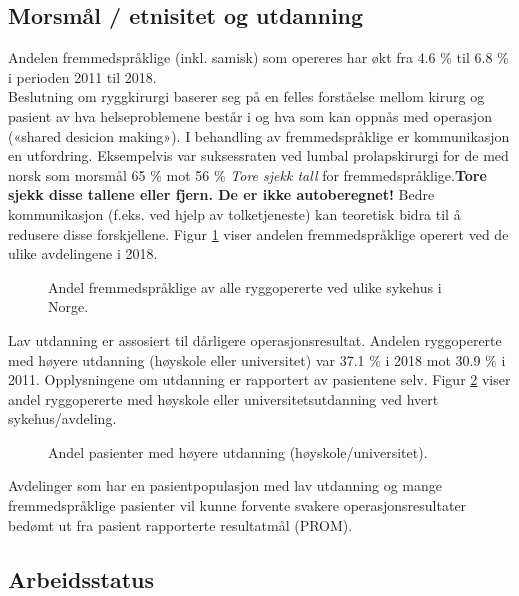 \documentclass [norsk,a4paper,twoside]{article}\usepackage[]{graphicx}\usepackage[]{color}
\begin{document}
\subsection{Morsmål / etnisitet og utdanning}



Andelen fremmedspråklige (inkl. samisk) som opereres har økt fra 4.6 \% til 6.8 \% i perioden 2011 til 2018.\\
Beslutning om ryggkirurgi baserer seg på en felles forståelse mellom kirurg og
pasient av hva helseproblemene består i og hva som kan oppnås med operasjon
(«shared desicion making»). I behandling av fremmedspråklige er kommunikasjon
en utfordring. Eksempelvis var suksessraten ved lumbal prolapskirurgi for de med norsk som morsmål 65 \% mot 56 \% 
\textit{Tore sjekk tall} 
for fremmedspråklige.\textbf{Tore sjekk disse tallene eller fjern. De er ikke autoberegnet!}  Bedre kommunikasjon (f.eks. ved hjelp av tolketjeneste) kan teoretisk bidra til å redusere disse
forskjellene. Figur \ref{fig:Morsmal} viser andelen fremmedspråklige operert ved de ulike avdelingene i 2018.

\begin{figure}[ht]
\caption{\label{fig:Morsmal} Andel fremmedspråklige av alle ryggopererte ved ulike sykehus i
Norge.}
\end{figure}




Lav utdanning er assosiert til dårligere operasjonsresultat. Andelen ryggopererte med høyere utdanning 
(høyskole eller universitet) var 37.1 \% i 2018 mot  30.9 \% 
i 2011. 
Opplysningene om utdanning er rapportert av pasientene selv. 
Figur \ref{fig:HoyUtdAvd} viser andel ryggopererte 
med høyskole eller universitetsutdanning ved hvert sykehus/avdeling.


\begin{figure}[ht]
\caption{\label{fig:HoyUtdAvd} Andel pasienter med høyere utdanning (høyskole/universitet).}
\end{figure}


\clearpage
Avdelinger som har en pasientpopulasjon med lav utdanning og mange fremmedspråklige pasienter vil kunne forvente svakere operasjonsresultater bedømt ut fra pasient rapporterte resultatmål (PROM).

\subsection{Arbeidsstatus}
\end{document}
